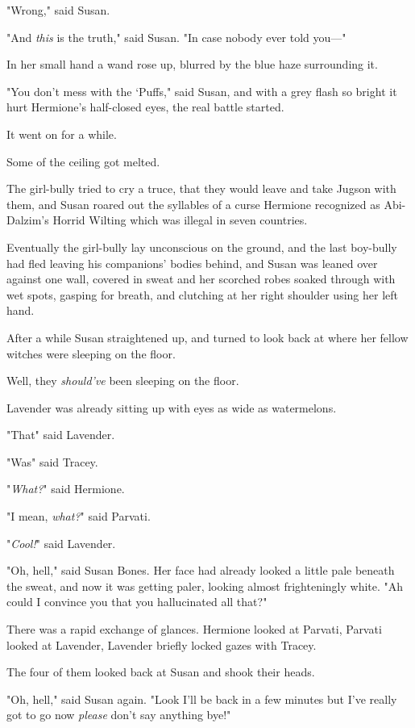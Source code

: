 "Wrong," said Susan.

"And \emph{this} is the truth," said Susan. "In case nobody ever told you\mbox{---}"

In her small hand a wand rose up, blurred by the blue haze surrounding it.

"You don't mess with the `Puffs," said Susan, and with a grey flash so bright
it hurt Hermione's half-closed eyes, the real battle started.

It went on for a while.

Some of the ceiling got melted.

The girl-bully tried to cry a truce, that they would leave and take Jugson with
them, and Susan roared out the syllables of a curse Hermione recognized as
Abi-Dalzim's Horrid Wilting which was illegal in seven countries.

Eventually the girl-bully lay unconscious on the ground, and
the last boy-bully had fled leaving his companions' bodies behind, and Susan
was leaned over against one wall, covered in sweat and her scorched robes
soaked through with wet spots, gasping for breath, and clutching at her right
shoulder using her left hand.

After a while Susan straightened up, and turned to look back at where her
fellow witches were sleeping on the floor.

Well, they \emph{should've} been sleeping on the floor.

Lavender was already sitting up with eyes as wide as watermelons.

"That{\el}" said Lavender.

"Was{\el}" said Tracey.

"\emph{What?}" said Hermione.

"I mean, \emph{what?}" said Parvati.

"\emph{Cool!}" said Lavender.

"Oh, hell," said Susan Bones. Her face had already looked a little pale beneath
the sweat, and now it was getting paler, looking almost frighteningly white.
"Ah{\el} could I convince you that you hallucinated all that?"

There was a rapid exchange of glances. Hermione looked at Parvati, Parvati
looked at Lavender, Lavender briefly locked gazes with Tracey.

The four of them looked back at Susan and shook their heads.

"Oh, hell," said Susan again. "Look I'll be back in a few minutes but I've
really got to go now \emph{please} don't say anything bye!"

